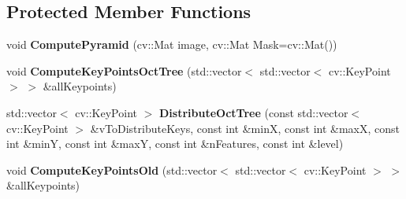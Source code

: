 \subsection*{Protected Member Functions}
\begin{DoxyCompactItemize}
\item 
void {\bfseries Compute\+Pyramid} (cv\+::\+Mat image, cv\+::\+Mat Mask=cv\+::\+Mat())\hypertarget{classORBextractor_a737c03fe3df8552491f6bfe2d7abcc55}{}\label{classORBextractor_a737c03fe3df8552491f6bfe2d7abcc55}

\item 
void {\bfseries Compute\+Key\+Points\+Oct\+Tree} (std\+::vector$<$ std\+::vector$<$ cv\+::\+Key\+Point $>$ $>$ \&all\+Keypoints)\hypertarget{classORBextractor_a2d24cca6d6ea431e7e300536331a5157}{}\label{classORBextractor_a2d24cca6d6ea431e7e300536331a5157}

\item 
std\+::vector$<$ cv\+::\+Key\+Point $>$ {\bfseries Distribute\+Oct\+Tree} (const std\+::vector$<$ cv\+::\+Key\+Point $>$ \&v\+To\+Distribute\+Keys, const int \&minX, const int \&maxX, const int \&minY, const int \&maxY, const int \&n\+Features, const int \&level)\hypertarget{classORBextractor_a9826f626998e1fff645a2d336c6bfb0d}{}\label{classORBextractor_a9826f626998e1fff645a2d336c6bfb0d}

\item 
void {\bfseries Compute\+Key\+Points\+Old} (std\+::vector$<$ std\+::vector$<$ cv\+::\+Key\+Point $>$ $>$ \&all\+Keypoints)\hypertarget{classORBextractor_aaf4575f9355b939a07090976946bc97f}{}\label{classORBextractor_aaf4575f9355b939a07090976946bc97f}

\end{DoxyCompactItemize}
